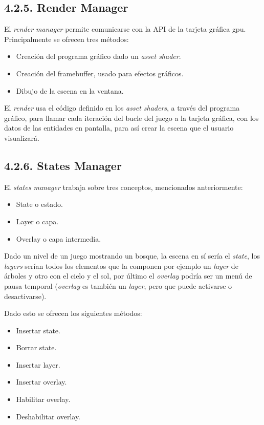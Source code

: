 \subsection*{4.2.5. Render Manager}\label{sec:workflow_managers_render}

El \textit{render manager} permite comunicarse con la API de la tarjeta gráfica \gls{gpu}.
Principalmente se ofrecen tres métodos:
\begin{itemize}
    \item Creación del programa gráfico dado un \textit{asset shader}.
    \item Creación del framebuffer, usado para efectos gráficos.
    \item Dibujo de la escena en la ventana.
\end{itemize}
El \textit{render} usa el código definido en los \textit{asset shaders}\cite{shaders-getting-started}, a través del programa gráfico,
para llamar cada iteración del bucle del juego a la tarjeta gráfica, con los datos de las 
entidades en pantalla, para así crear la escena que el usuario visualizará.

\subsection*{4.2.6. States Manager}\label{sec:workflow_managers_states}

El \textit{states manager} trabaja sobre tres conceptos, mencionados anteriormente:
\begin{itemize}
    \item State o estado.
    \item Layer o capa.
    \item Overlay o capa intermedia.
\end{itemize}
Dado un nivel de un juego mostrando un bosque, la escena en sí sería el \textit{state}, los \textit{layers} serían todos los elementos que la componen
por ejemplo un \textit{layer} de árboles y otro con el cielo y el sol, por último el \textit{overlay} podría ser un menú de pausa
temporal (\textit{overlay} es también un \textit{layer}, pero que puede activarse o desactivarse).

Dado esto se ofrecen los siguientes métodos:
\begin{itemize}
    \item Insertar state.
    \item Borrar state.
    \item Insertar layer.
    \item Insertar overlay.
    \item Habilitar overlay.
    \item Deshabilitar overlay.
\end{itemize}

